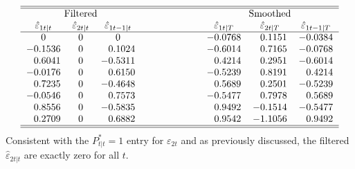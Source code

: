 \documentclass[a4paper,12pt]{article}
\begin{document}
\begin{equation*}
\begin{tabular}{ccccccc}
\hline\hline
\multicolumn{3}{c}{Filtered} & ~~~~~~~~~~~~~~~ & \multicolumn{3}{c}{Smoothed}
\\ 
$\hat{\varepsilon}_{1t|t}$ & $\hat{\varepsilon}_{2t|t}$ & $\hat{\varepsilon}%
_{1t-1|t}$ &  & $\hat{\varepsilon}_{1t|T}$ & $\hat{\varepsilon}_{2t|T}$ & $%
\hat{\varepsilon}_{1t-1|T}$ \\ \hline
$0$ & $0$ & $0$ &  & \multicolumn{1}{r}{$-0.0768$} & \multicolumn{1}{r}{$%
0.1151$} & \multicolumn{1}{r}{$-0.0384$} \\ 
\multicolumn{1}{r}{$-0.1536$} & $0$ & \multicolumn{1}{r}{$0.1024$} &  & 
\multicolumn{1}{r}{$-0.6014$} & \multicolumn{1}{r}{$0.7165$} & 
\multicolumn{1}{r}{$-0.0768$} \\ 
\multicolumn{1}{r}{$0.6041$} & $0$ & \multicolumn{1}{r}{$-0.5311$} &  & 
\multicolumn{1}{r}{$0.4214$} & \multicolumn{1}{r}{$0.2951$} & 
\multicolumn{1}{r}{$-0.6014$} \\ 
\multicolumn{1}{r}{$-0.0176$} & $0$ & \multicolumn{1}{r}{$0.6150$} &  & 
\multicolumn{1}{r}{$-0.5239$} & \multicolumn{1}{r}{$0.8191$} & 
\multicolumn{1}{r}{$0.4214$} \\ 
\multicolumn{1}{r}{$0.7235$} & $0$ & \multicolumn{1}{r}{$-0.4648$} &  & 
\multicolumn{1}{r}{$0.5689$} & \multicolumn{1}{r}{$0.2501$} & 
\multicolumn{1}{r}{$-0.5239$} \\ 
\multicolumn{1}{r}{$-0.0546$} & $0$ & \multicolumn{1}{r}{$0.7573$} &  & 
\multicolumn{1}{r}{$-0.5477$} & \multicolumn{1}{r}{$0.7978$} & 
\multicolumn{1}{r}{$0.5689$} \\ 
\multicolumn{1}{r}{$0.8556$} & $0$ & \multicolumn{1}{r}{$-0.5835$} &  & 
\multicolumn{1}{r}{$0.9492$} & \multicolumn{1}{r}{$-0.1514$} & 
\multicolumn{1}{r}{$-0.5477$} \\ 
\multicolumn{1}{r}{$0.2709$} & $0$ & \multicolumn{1}{r}{$0.6882$} &  & 
\multicolumn{1}{r}{$0.9542$} & \multicolumn{1}{r}{$-1.1056$} & 
\multicolumn{1}{r}{$0.9492$} \\ \hline\hline
\end{tabular}%
\end{equation*}%
Consistent with the $P_{t|t}^{\ast }=1$ entry for $\varepsilon _{2t}$ and as
previously discussed, the filtered $\hat{\varepsilon}_{2t|t}$ are exactly
zero for all $t$.
\end{document}
